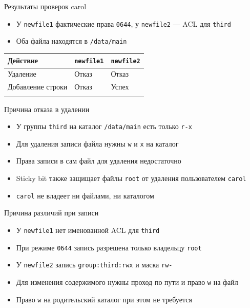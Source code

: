 \documentclass[
  ignorenonframetext,
  aspectratio=169,
  russian,
]{beamer}
\newcounter{none} %
\providecommand{\tightlist}{%
  \setlength{\itemsep}{0pt}\setlength{\parskip}{0pt}}
\begin{document}
\begin{frame}[fragile]{Результаты проверок carol}
\protect{}\label{ux440ux435ux437ux443ux43bux44cux442ux430ux442ux44b-ux43fux440ux43eux432ux435ux440ux43eux43a-carol}
\begin{itemize}
\tightlist
\item
  У \texttt{newfile1} фактические права \texttt{0644}, у
  \texttt{newfile2} --- ACL для \texttt{third}
\item
  Оба файла находятся в \texttt{/data/main}
\end{itemize}

{\def\LTcaptype{none} %
\begin{longtable}[]{@{}lll@{}}
\toprule\noalign{}
Действие & \texttt{newfile1} & \texttt{newfile2} \\
\midrule\noalign{}
\endhead
Удаление & Отказ & Отказ \\
Добавление строки & Отказ & Успех \\
\bottomrule\noalign{}
\end{longtable}
}
\end{frame}

\begin{frame}[fragile]{Причина отказа в удалении}
\protect{}\label{ux43fux440ux438ux447ux438ux43dux430-ux43eux442ux43aux430ux437ux430-ux432-ux443ux434ux430ux43bux435ux43dux438ux438}
\begin{itemize}
\tightlist
\item
  У группы \texttt{third} на каталог \texttt{/data/main} есть только
  \texttt{r-x}
\item
  Для удаления записи файла нужны \texttt{w} и \texttt{x} на каталог
\item
  Права записи в сам файл для удаления недостаточно
\item
  Sticky bit также защищает файлы \texttt{root} от удаления
  пользователем \texttt{carol}
\item
  \texttt{carol} не владеет ни файлами, ни каталогом
\end{itemize}
\end{frame}

\begin{frame}[fragile]{Причина различий при записи}
\protect{}\label{ux43fux440ux438ux447ux438ux43dux430-ux440ux430ux437ux43bux438ux447ux438ux439-ux43fux440ux438-ux437ux430ux43fux438ux441ux438}
\begin{itemize}
\tightlist
\item
  У \texttt{newfile1} нет именованной ACL для \texttt{third}
\item
  При режиме \texttt{0644} запись разрешена только владельцу
  \texttt{root}
\item
  У \texttt{newfile2} запись \texttt{group:third:rwx} и маска
  \texttt{rw-}
\item
  Для изменения содержимого нужны проход по пути и право \texttt{w} на
  файл
\item
  Право \texttt{w} на родительский каталог при этом не требуется
\end{itemize}
\end{frame}
\end{document}
